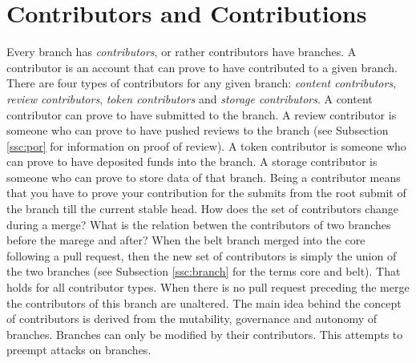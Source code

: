 \documentclass[14pt]{article}
\begin{document}
\section{Contributors and Contributions}
\label{ssc:contributors}

Every branch has \textit{contributors}, or rather contributors have branches. A contributor is an account that can prove to have contributed to a given branch. There are four types of contributors for any given branch: \textit{content contributors}, \textit{review contributors}, \textit{token contributors} and \textit{storage contributors}. A content contributor can prove to have submitted to the branch. A review contributor is someone who can prove to have pushed reviews to the branch (see Subsection \ref{ssc:por} for information on proof of review). A token contributor is someone who can prove to have deposited funds into the branch. A storage contributor is someone who can prove to store data of that branch. Being a contributor means that you have to prove your contribution for the submits from the root submit of the branch till the current stable head.
How does the set of contributors change during a merge? What is the relation betwen the contributors of two branches before the marege and after? When the belt branch merged into the core following a pull request, then the new set of contributors is simply the union of the two branches (see Subsection \ref{ssc:branch} for the terms core and belt). That holds for all contributor types. When there is no pull request preceding the merge the contributors of this branch are unaltered.
The main idea behind the concept of contributors is derived from the mutability, governance and autonomy of branches. Branches can only be modified by their contributors. This attempts to preempt attacks on branches.

% 

% 
% 
% 
% 
% 
\end{document}
